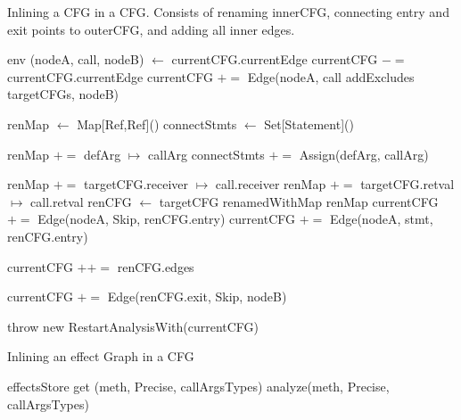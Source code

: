 \documentclass[a4paper]{article}
\begin{document}
\begin{algorithm}
\caption{Inlining a CFG in a CFG. Consists of renaming innerCFG, connecting
entry and exit points to outerCFG, and adding all inner
edges.}\label{algo:pt:inlinebycfg}
\begin{algorithmic}[1]
        \State \Return env
    \Else
        \State (nodeA, call, nodeB) $\gets$ currentCFG.currentEdge
        \State currentCFG $-=$ currentCFG.currentEdge
        \State currentCFG $+=$ Edge(nodeA, call addExcludes targetCFGs, nodeB)

            \State renMap $\gets$ Map[Ref,Ref]()
            \State connectStmts $\gets$ Set[Statement]()
            \State

                    \State renMap $+=$ defArg $\mapsto$ callArg
                \Else
                    \State connectStmts $+=$ Assign(defArg, callArg)
                \EndIf

            \EndFor
            \State
            \State renMap $+=$ targetCFG.receiver $\mapsto$ call.receiver
            \State renMap $+=$ targetCFG.retval   $\mapsto$ call.retval
            \State
            \State renCFG $\gets$ targetCFG renamedWithMap renMap
            \State
                \State currentCFG $+=$ Edge(nodeA, Skip, renCFG.entry)
            \Else
                    \State currentCFG $+=$ Edge(nodeA, stmt, renCFG.entry)
                \EndFor
            \EndIf

            \State currentCFG $++=$ renCFG.edges

            \State currentCFG $+=$ Edge(renCFG.exit, Skip, nodeB)
        \EndFor

        \State throw new RestartAnalysisWith(currentCFG)
    \EndIf
\EndFunction
\end{algorithmic}
\end{algorithm}

\begin{algorithm}
\caption{Inlining an effect Graph in a CFG}\label{algo:pt:inlinebyeffect}
\begin{algorithmic}[1]
        \State \Return effectsStore get (meth, Precise, callArgsTypes)
    \Else
        \State \Return analyze(meth, Precise, callArgsTypes)
    \EndIf
\EndFunction
\end{algorithmic}
\end{algorithm}
\end{document}
